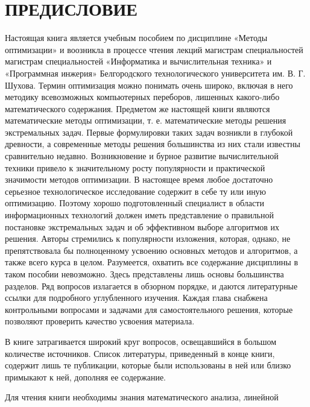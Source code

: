 \section{ПРЕДИСЛОВИЕ}

	Настоящая книга является учебным пособием по дисциплине «Методы оптимизации» и воозникла в процессе чтения лекций магистрам специальностей магистрам специальностей «Информатика и вычислительная техника» и «Программная инжерия» Белгородского технологического университета им. В. Г. Шухова. Термин оптимизация можно понимать очень широко, включая в него методику всевозможных компьютерных переборов, лишенных какого-либо математического содержания. Предметом же настоящей книги являются математические методы оптимизации, т. е. математические методы решения экстремальных задач. Первые формулировки таких задач возникли в глубокой древности, а современные методы решения большинства из них стали известны сравнительно недавно. Возникновение и бурное развитие вычислительной техники привело к значительному росту популярности и практической значимости методов оптимизации. В настоящее время любое достаточно серьезное технологическое исследование содержит в себе ту или иную оптимизацию. Поэтому хорошо подготовленный специалист в области информационных технологий должен иметь представление о правильной постановке экстремальных задач и об эффективном выборе алгоритмов их решения. Авторы стремились к популярности изложения, которая, однако, не препятствовала бы полноценному усвоению основных методов и алгоритмов, а также всего курса в целом. Разумеется, охватить все содержание дисциплины в таком пособии невозможно. Здесь представлены лишь основы большинства разделов. Ряд вопросов излагается в обзорном порядке, и даются литературные ссылки для подробного углубленного изучения. Каждая глава снабжена контрольными вопросами и задачами для самостоятельного решения, которые позволяют проверить качество усвоения материала.

	В книге затрагивается широкий круг вопросов, освещавшийся в большом количестве источников. Список литературы, приведенный в конце книги, содержит лишь те публикации, которые были использованы в ней или близко примыкают к ней, дополняя ее содержание.

	Для чтения книги необходимы знания математического анализа, линейной алгебры, аналитической геометрии и теории вероятностей в объеме университетского курса бакалавриата. При рассмотрении вопросов бесконечномерной оптимизации необходимы также некоторые сведения из функционального анализа, которые, однако, кратко изложены в соответствующих местах настоящего пособия.

